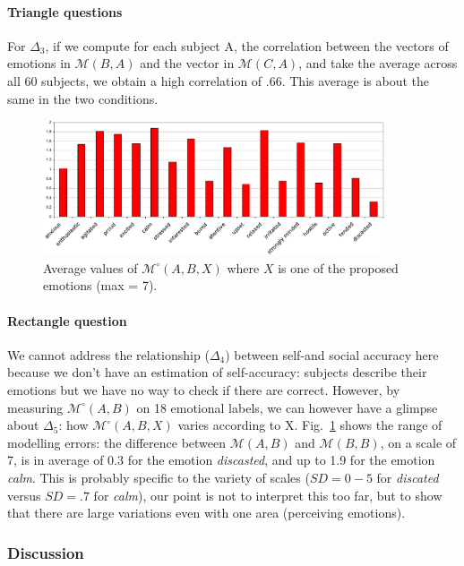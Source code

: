 \documentclass[natbib]{svjour3}
\newcommand{\gmodel}[2]{{$\mathcal{M}(#1, #2)$}}
\newcommand{\Model}[3]{{$\mathcal{M}^{\circ}(#1, #2, #3)$}}
\newcommand{\gModel}[2]{{$\mathcal{M}^{\circ}(#1, #2)$}}
\begin{document}
\paragraph{Triangle questions}  For $\Delta_3$, if we
compute for each subject A, the correlation between the vectors of emotions in
\gmodel{B}{A} and the vector in \gmodel{C}{A}, and take the average across all
60 subjects, we obtain a high correlation of .66. This average is
about the same in the two conditions.

\begin{figure}[ht!]
        \centering
        \includegraphics[width=0.9\textwidth]{image9.pdf}
        \caption{Average values of \Model{A}{B}{X} where $X$ is one of the proposed
        emotions (max = 7).}
        \label{study3:deg_m_values}
\end{figure}


\paragraph{Rectangle question} We cannot address the relationship ($\Delta_4$)
between self-and social accuracy here because we don't have an estimation of
self-accuracy: subjects describe their emotions but we have no way to check if
there are correct. However, by measuring \gModel{A}{B} on  18 emotional labels,
we can however have a glimpse about $\Delta_5$: how \Model{A}{B}{X} varies
according to X.  Fig.~\ref{study3:deg_m_values} shows the range of modelling
errors: the difference between \gmodel{A}{B} and \gmodel{B}{B}, on a scale of 7,
is in average of 0.3 for the emotion \emph{discasted}, and up to 1.9 for the
emotion \emph{calm}. This is probably specific to the variety of scales  ($SD=
0-5$ for \emph{discated} versus $SD=.7$ for \emph{calm}), our point is not to
interpret this too far, but to show that there are large variations even with one
area  (perceiving emotions). 

\subsubsection*{Discussion}
\end{document}
